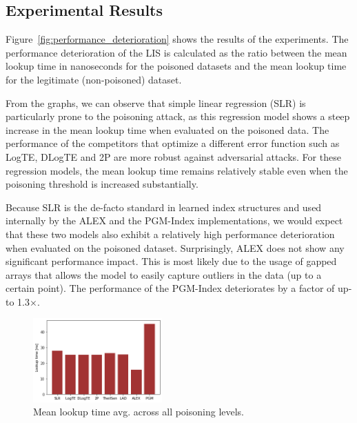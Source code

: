 \documentclass[sigconf]{acmart}
\begin{document}
\vspace{-2em}
\subsection{Experimental Results}

Figure~\ref{fig:performance_deterioration} shows the results of the experiments. The performance deterioration of the \ac{LIS} is calculated as the ratio between the mean lookup time in nanoseconds for the poisoned datasets and the mean lookup time for the legitimate (non-poisoned) dataset.

From the graphs, we can observe that simple linear regression (SLR) is particularly prone to the poisoning attack, as this regression model shows a steep increase in the mean lookup time when evaluated on the poisoned data. The performance of the competitors that optimize a different error function such as LogTE, DLogTE and 2P are more robust against adversarial attacks. For these regression models, the mean lookup time remains relatively stable even when the poisoning threshold is increased substantially.

Because SLR is the de-facto standard in learned index structures and used internally by the \ac{ALEX} and the \ac{PGM}-Index implementations, we would expect that these two models also exhibit a relatively high performance deterioration when evaluated on the poisoned dataset. Surprisingly, ALEX does not show any significant performance impact. This is most likely due to the usage of gapped arrays that allows the model to easily capture outliers in the data (up to a certain point). The performance of the PGM-Index deteriorates by a factor of up-to 1.3$\times$.

\begin{figure}[h]
    \centering
      \includegraphics[width=0.44\textwidth]{figures/learned_indexes-mean_lookup_time-average.png}
      \vspace{-0.5em}
        \caption{Mean lookup time  avg.
across all poisoning levels.}
        \vspace{-0.5em}
        \label{fig:lookup}
\end{figure}
\end{document}
